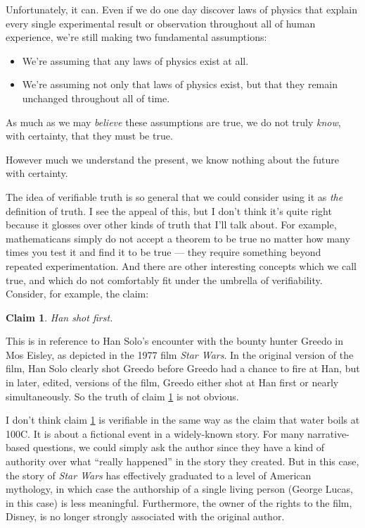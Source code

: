 \documentclass[11pt, oneside]{article}   	%
\newtheorem{claim}{Claim}
\begin{document}
Unfortunately, it can. Even if we do one day discover laws of physics that
explain every single experimental result or observation throughout all of human
experience, we're still making two fundamental assumptions:
\begin{itemize}
    \item We're assuming that any laws of physics exist at all.
    \item We're assuming not only that laws of physics exist, but that they
        remain unchanged throughout all of time.
\end{itemize}
As much as we may {\em believe} these assumptions are true, we do not truly {\em
know}, with certainty, that they must be true.

However much we understand the present, we know nothing about
the future with certainty.

The idea of verifiable truth is so general that we could consider using it as
{\em the} definition of truth. I see the appeal of this, but I don't think it's
quite right because it glosses over other kinds of truth that I'll talk
about. For example, mathematicans simply do not accept a theorem to be true no
matter how many times you test it and find it to be true --- they require
something beyond repeated experimentation. And there are other interesting
concepts which we call true, and which do not comfortably fit under the umbrella
of verifiability. Consider, for example, the claim:
\begin{claim}\label{c2}
    Han shot first.
\end{claim}
This is in reference to Han Solo's encounter with the bounty hunter Greedo in
Mos Eisley, as depicted in the 1977 film {\em Star Wars}.
In the original version of the film, Han Solo clearly shot Greedo before Greedo
had a chance to
fire at Han, but in later, edited, versions of the film, Greedo either shot at
Han first or nearly simultaneously. So the truth of claim \ref{c2} is not
obvious.

I don't think claim \ref{c2} is verifiable in the same way as the claim that
water boils at 100\degree C.
It is about a fictional event in a widely-known story.
For many narrative-based questions, we could simply ask the author since they
have a kind of authority over what ``really happened'' in the story they
created. But in this case, the story of {\em Star Wars} has effectively
graduated to a level of American mythology, in which case the authorship of a
single living person (George Lucas, in this case) is less meaningful.
Furthermore, the owner of the rights to the film, Disney, is no longer strongly
associated with the original author.
\end{document}
